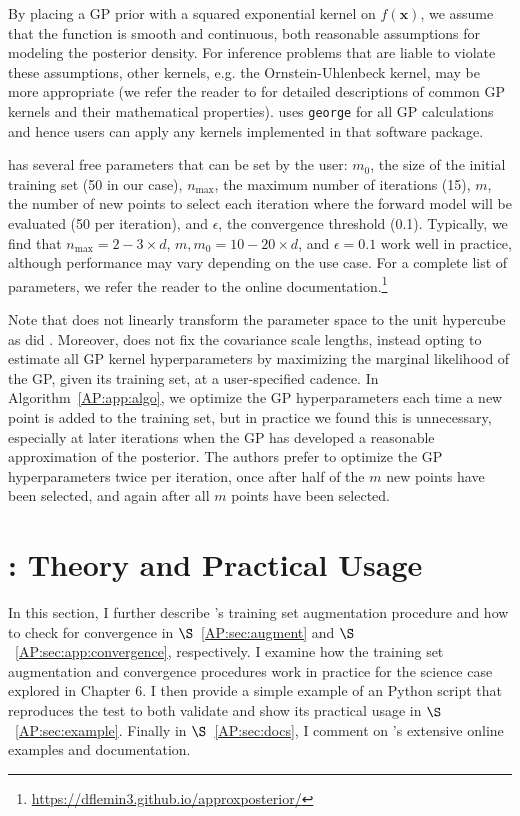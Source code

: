 By placing a GP prior with a squared exponential kernel on $f(\textbf{x})$, we assume that the function is smooth and continuous, both reasonable assumptions for modeling the posterior density. For inference problems that are liable to violate these assumptions, other kernels, e.g. the Ornstein-Uhlenbeck kernel, may be more appropriate (we refer the reader to \citet{Rasmussen2006} for detailed descriptions of common GP kernels and their mathematical properties). \approxposterior uses \texttt{george} \citep{george} for all GP calculations and hence users can apply any kernels implemented in that software package.

\approxposterior has several free parameters that can be set by the user: $m_0$, the size of the initial training set (50 in our case), $n_{\mathrm{max}}$, the maximum number of iterations (15), $m$, the number of new points to select each iteration where the forward model will be evaluated (50 per iteration), and $\epsilon$, the convergence threshold (0.1). Typically, we find that $n_{\mathrm{max}}=2-3 \times d$, $m, m_0 = 10-20 \times d$, and $\epsilon = 0.1$ work well in practice, although performance may vary depending on the use case. For a complete list of \approxposterior parameters, we refer the reader to the online documentation.\footnote{ \href{https://dflemin3.github.io/approxposterior}{https://dflemin3.github.io/approxposterior/}}

Note that \approxposterior does not linearly transform the parameter space to the unit hypercube as did \citet{Kandasamy2017}. Moreover, \approxposterior does not fix the covariance scale lengths, instead opting to estimate all GP kernel hyperparameters by maximizing the marginal likelihood of the GP, given its training set, at a user-specified cadence. In Algorithm~\ref{AP:app:algo}, we optimize the GP hyperparameters each time a new point is added to the training set, but in practice we found this is unnecessary, especially at later iterations when the GP has developed a reasonable approximation of the posterior. The authors prefer to optimize the GP hyperparameters twice per iteration, once after half of the $m$ new points have been selected, and again after all $m$ points have been selected.

\section{\approxposterior: Theory and Practical Usage} \label{ap:sec:usage}

In this section, I further describe \approxposterior's training set augmentation procedure and how to check for convergence in $\S$~\ref{AP:sec:augment} and $\S$~\ref{AP:sec:app:convergence}, respectively. I examine how the \approxposterior training set augmentation and convergence procedures work in practice for the science case explored in Chapter 6.  I then provide a simple example of an \approxposterior Python script that reproduces the \citet{Wang2018} test to both validate \approxposterior and show its practical usage in $\S$~\ref{AP:sec:example}. Finally in $\S$~\ref{AP:sec:docs}, I comment on \approxposterior's extensive online examples and documentation.

